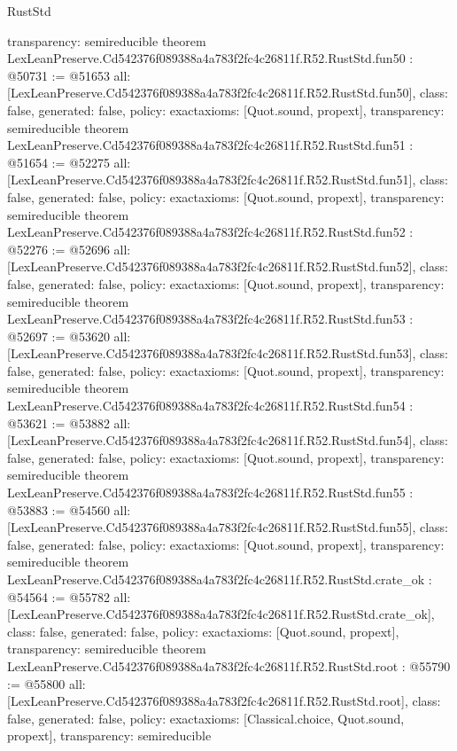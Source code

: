 \begin{lexlean}{RustStd}
\begin{coremodule}
{  transparency: semireducible
}
theorem LexLeanPreserve.Cd542376f089388a4a783f2fc4c26811f.R52.RustStd.fun50 : @50731 := @51653 {
  all: [LexLeanPreserve.Cd542376f089388a4a783f2fc4c26811f.R52.RustStd.fun50],
  class: false,
  generated: false,
  policy: exact{axioms: [Quot.sound, propext]},
  transparency: semireducible
}
theorem LexLeanPreserve.Cd542376f089388a4a783f2fc4c26811f.R52.RustStd.fun51 : @51654 := @52275 {
  all: [LexLeanPreserve.Cd542376f089388a4a783f2fc4c26811f.R52.RustStd.fun51],
  class: false,
  generated: false,
  policy: exact{axioms: [Quot.sound, propext]},
  transparency: semireducible
}
theorem LexLeanPreserve.Cd542376f089388a4a783f2fc4c26811f.R52.RustStd.fun52 : @52276 := @52696 {
  all: [LexLeanPreserve.Cd542376f089388a4a783f2fc4c26811f.R52.RustStd.fun52],
  class: false,
  generated: false,
  policy: exact{axioms: [Quot.sound, propext]},
  transparency: semireducible
}
theorem LexLeanPreserve.Cd542376f089388a4a783f2fc4c26811f.R52.RustStd.fun53 : @52697 := @53620 {
  all: [LexLeanPreserve.Cd542376f089388a4a783f2fc4c26811f.R52.RustStd.fun53],
  class: false,
  generated: false,
  policy: exact{axioms: [Quot.sound, propext]},
  transparency: semireducible
}
theorem LexLeanPreserve.Cd542376f089388a4a783f2fc4c26811f.R52.RustStd.fun54 : @53621 := @53882 {
  all: [LexLeanPreserve.Cd542376f089388a4a783f2fc4c26811f.R52.RustStd.fun54],
  class: false,
  generated: false,
  policy: exact{axioms: [Quot.sound, propext]},
  transparency: semireducible
}
theorem LexLeanPreserve.Cd542376f089388a4a783f2fc4c26811f.R52.RustStd.fun55 : @53883 := @54560 {
  all: [LexLeanPreserve.Cd542376f089388a4a783f2fc4c26811f.R52.RustStd.fun55],
  class: false,
  generated: false,
  policy: exact{axioms: [Quot.sound, propext]},
  transparency: semireducible
}
theorem LexLeanPreserve.Cd542376f089388a4a783f2fc4c26811f.R52.RustStd.crate_ok : @54564 := @55782 {
  all: [LexLeanPreserve.Cd542376f089388a4a783f2fc4c26811f.R52.RustStd.crate_ok],
  class: false,
  generated: false,
  policy: exact{axioms: [Quot.sound, propext]},
  transparency: semireducible
}
theorem LexLeanPreserve.Cd542376f089388a4a783f2fc4c26811f.R52.RustStd.root : @55790 := @55800 {
  all: [LexLeanPreserve.Cd542376f089388a4a783f2fc4c26811f.R52.RustStd.root],
  class: false,
  generated: false,
  policy: exact{axioms: [Classical.choice, Quot.sound, propext]},
  transparency: semireducible
}


\end{coremodule}
\end{lexlean}
